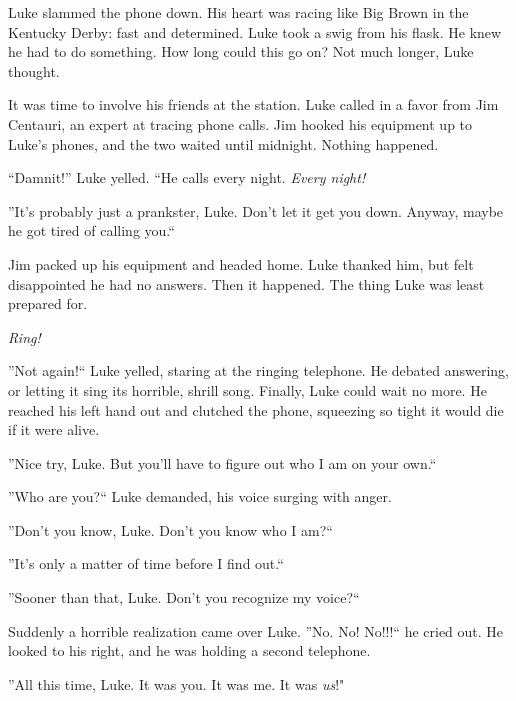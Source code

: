 Luke slammed the phone down. His heart was racing like Big Brown in
the Kentucky Derby: fast and determined. Luke took a swig from his
flask. He knew he had to do something. How long could this go on?
Not much longer, Luke thought.



It was time to involve his friends at the station. Luke called in a
favor from Jim Centauri, an expert at tracing phone calls. Jim
hooked his equipment up to Luke's phones, and the two waited until
midnight. Nothing happened.



``Damnit!'' Luke yelled. ``He calls every night. {\em Every
night!}



''It's probably just a prankster, Luke. Don't let it get you down.
Anyway, maybe he got tired of calling you.``



Jim packed up his equipment and headed home. Luke thanked him, but
felt disappointed he had no answers. Then it happened. The thing
Luke was least prepared for.



{\em Ring!}



''Not again!`` Luke yelled, staring at the ringing telephone. He
debated answering, or letting it sing its horrible, shrill song.
Finally, Luke could wait no more. He reached his left hand out and
clutched the phone, squeezing so tight it would die if it were
alive.



''Nice try, Luke. But you'll have to figure out who I am on your
own.``



''Who are you?`` Luke demanded, his voice surging with anger.



''Don't you know, Luke. Don't you know who I am?``



''It's only a matter of time before I find out.``



''Sooner than that, Luke. Don't you recognize my voice?``



Suddenly a horrible realization came over Luke. ''No. No! No!!!`` he
cried out. He looked to his right, and he was holding a second
telephone.



''All this time, Luke. It was you. It was me. It was
{\em us}!"



